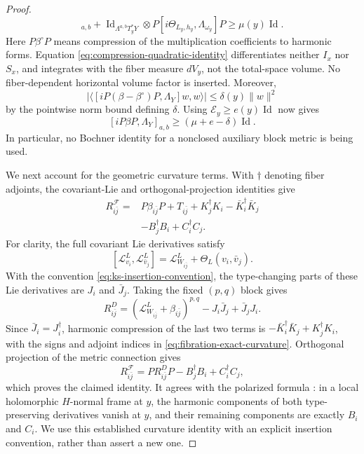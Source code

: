 \documentclass[11pt,reqno]{amsart}
\numberwithin{equation}{section}
\theoremstyle{definition}
\theoremstyle{remark}
\newcommand{\cF}{\mathcal F}
\newcommand{\Id}{\operatorname{Id}}
\newcommand{\ip}[2]{\langle #1,#2\rangle}
\begin{document}
\begin{proof}
\begin{equation}
 [iP\beta^\circ P,\Lambda_Y]_{a,b}
 +\Id_{\Lambda^{a,b}T_y^*Y}\otimes
       P[i\Theta_{L_y,h_y},\Lambda_{\omega_y}]P
 \geq\mu(y)\Id.
\end{equation}
Here $P\beta^\circ P$ means compression of the multiplication coefficients to harmonic forms. Equation \eqref{eq:compression-quadratic-identity} differentiates neither $I_x$ nor $S_x$, and integrates with the fiber measure $dV_y$, not the total-space volume. No fiber-dependent horizontal volume factor is inserted. Moreover,
\[
 \left|\ip{[iP(\beta-\beta^\circ)P,\Lambda_Y]w}{w}\right|
       \leq\delta(y)\|w\|^2
\]
by the pointwise norm bound defining $\delta$. Using $\mathcal E_y\geq e(y)\Id$ now gives
\begin{equation}\label{eq:fibration-horizontal-lower}
 [iP\beta P,\Lambda_Y]_{a,b}
 \geq(\mu+e-\delta)\Id.
\end{equation}
In particular, no Bochner identity for a nonclosed auxiliary block metric is being used.

We next account for the geometric curvature terms. With $\dagger$ denoting fiber adjoints, the covariant-Lie and orthogonal-projection identities give
\begin{equation}\label{eq:fibration-exact-curvature}
\begin{split}
 R^{\cF}_{i\bar j}={}&P\beta_{i\bar j}P+T_{i\bar j}
      +K_j^\dagger K_i-\bar K_i^\dagger\bar K_j\\
     &-B_j^\dagger B_i+C_i^\dagger C_j.
\end{split}
\end{equation}
For clarity, the full covariant Lie derivatives satisfy
\[
 [\mathcal L^L_{v_i},\mathcal L^L_{\bar v_j}]
   =\mathcal L^L_{W_{i\bar j}}+\Theta_L(v_i,\bar v_j).
\]
With the convention \eqref{eq:ks-insertion-convention}, the type-changing parts of these Lie derivatives are $J_i$ and $\bar J_j$. Taking the fixed $(p,q)$ block gives
\[
 R^D_{i\bar j}
  =(\mathcal L^L_{W_{i\bar j}}+\beta_{i\bar j})^{p,q}
       -J_i\bar J_j+\bar J_jJ_i.
\]
Since $\bar J_i=J_i^\dagger$, harmonic compression of the last two terms is
$-\bar K_i^\dagger\bar K_j+K_j^\dagger K_i$, with the signs and adjoint indices in \eqref{eq:fibration-exact-curvature}. Orthogonal projection of the metric connection gives
\[
 R^{\cF}_{i\bar j}=PR^D_{i\bar j}P
                         -B_j^\dagger B_i+C_i^\dagger C_j,
\]
which proves the claimed identity. It agrees with the polarized formula \cite[(7.2)]{CS24}: in a local holomorphic $H$-normal frame at $y$, the harmonic components of both type-preserving derivatives vanish at $y$, and their remaining components are exactly $B_i$ and $C_i$. We use this established curvature identity with an explicit insertion convention, rather than assert a new one.


\end{proof}
\end{document}
